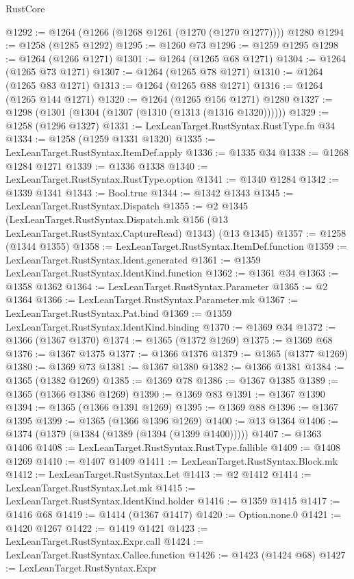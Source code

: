 \begin{lexlean}{RustCore}
\begin{coremodule}
@1292 := @1264 (@1266 (@1268 @1261 (@1270 (@1270 @1277)))) @1280
@1294 := @1258 (@1285 @1292)
@1295 := @1260 @73
@1296 := @1259 @1295
@1298 := @1264 (@1266 @1271)
@1301 := @1264 (@1265 @68 @1271)
@1304 := @1264 (@1265 @73 @1271)
@1307 := @1264 (@1265 @78 @1271)
@1310 := @1264 (@1265 @83 @1271)
@1313 := @1264 (@1265 @88 @1271)
@1316 := @1264 (@1265 @144 @1271)
@1320 := @1264 (@1265 @156 @1271) @1280
@1327 := @1298 (@1301 (@1304 (@1307 (@1310 (@1313 (@1316 @1320))))))
@1329 := @1258 (@1296 @1327)
@1331 := LexLeanTarget.RustSyntax.RustType.fn @34
@1334 := @1258 (@1259 @1331 @1320)
@1335 := LexLeanTarget.RustSyntax.ItemDef.apply
@1336 := @1335 @34
@1338 := @1268 @1284 @1271
@1339 := @1336 @1338
@1340 := LexLeanTarget.RustSyntax.RustType.option
@1341 := @1340 @1284
@1342 := @1339 @1341
@1343 := Bool.true
@1344 := @1342 @1343
@1345 := LexLeanTarget.RustSyntax.Dispatch
@1355 := @2
    @1345
    (LexLeanTarget.RustSyntax.Dispatch.mk @156 (@13 LexLeanTarget.RustSyntax.CaptureRead) @1343)
    (@13 @1345)
@1357 := @1258 (@1344 @1355)
@1358 := LexLeanTarget.RustSyntax.ItemDef.function
@1359 := LexLeanTarget.RustSyntax.Ident.generated
@1361 := @1359 LexLeanTarget.RustSyntax.IdentKind.function
@1362 := @1361 @34
@1363 := @1358 @1362
@1364 := LexLeanTarget.RustSyntax.Parameter
@1365 := @2 @1364
@1366 := LexLeanTarget.RustSyntax.Parameter.mk
@1367 := LexLeanTarget.RustSyntax.Pat.bind
@1369 := @1359 LexLeanTarget.RustSyntax.IdentKind.binding
@1370 := @1369 @34
@1372 := @1366 (@1367 @1370)
@1374 := @1365 (@1372 @1269)
@1375 := @1369 @68
@1376 := @1367 @1375
@1377 := @1366 @1376
@1379 := @1365 (@1377 @1269)
@1380 := @1369 @73
@1381 := @1367 @1380
@1382 := @1366 @1381
@1384 := @1365 (@1382 @1269)
@1385 := @1369 @78
@1386 := @1367 @1385
@1389 := @1365 (@1366 @1386 @1269)
@1390 := @1369 @83
@1391 := @1367 @1390
@1394 := @1365 (@1366 @1391 @1269)
@1395 := @1369 @88
@1396 := @1367 @1395
@1399 := @1365 (@1366 @1396 @1269)
@1400 := @13 @1364
@1406 := @1374 (@1379 (@1384 (@1389 (@1394 (@1399 @1400)))))
@1407 := @1363 @1406
@1408 := LexLeanTarget.RustSyntax.RustType.fallible
@1409 := @1408 @1269
@1410 := @1407 @1409
@1411 := LexLeanTarget.RustSyntax.Block.mk
@1412 := LexLeanTarget.RustSyntax.Let
@1413 := @2 @1412
@1414 := LexLeanTarget.RustSyntax.Let.mk
@1415 := LexLeanTarget.RustSyntax.IdentKind.holder
@1416 := @1359 @1415
@1417 := @1416 @68
@1419 := @1414 (@1367 @1417)
@1420 := Option.none.{0}
@1421 := @1420 @1267
@1422 := @1419 @1421
@1423 := LexLeanTarget.RustSyntax.Expr.call
@1424 := LexLeanTarget.RustSyntax.Callee.function
@1426 := @1423 (@1424 @68)
@1427 := LexLeanTarget.RustSyntax.Expr

\end{coremodule}
\end{lexlean}
